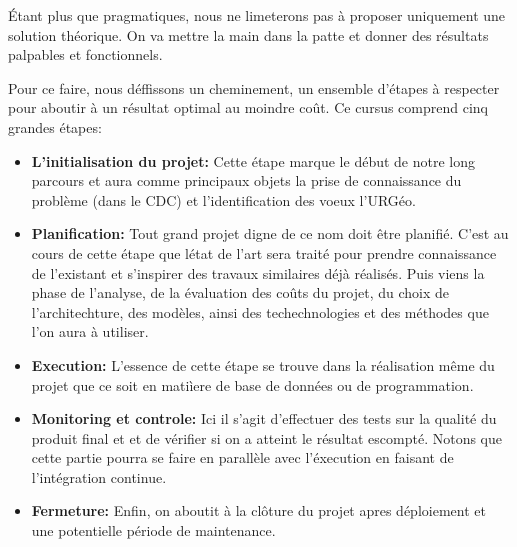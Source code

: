\par
Étant plus que pragmatiques, nous ne limeterons pas à proposer 
uniquement une solution théorique. On va mettre la main dans la patte
et donner des résultats palpables et fonctionnels.
\par
Pour ce faire, nous déffissons un cheminement, un ensemble d'étapes à 
respecter pour aboutir à un résultat optimal au moindre coût.
Ce cursus comprend cinq grandes étapes: 

\begin{itemize}
    \item \textbf{L'initialisation du projet: }
    Cette étape marque le début de notre long parcours et aura comme principaux
    objets la prise de connaissance du problème (dans le CDC) et l'identification des voeux
    l'URGéo.
    \item \textbf{Planification: }
    Tout grand projet digne de ce nom doit être planifié. C'est au cours de cette étape
    que létat de l'art sera traité pour prendre connaissance de l'existant et s'inspirer des travaux
    similaires déjà réalisés. Puis viens la phase de l'analyse, de la évaluation des coûts du projet, 
    du choix  de l'architechture, des modèles,
    ainsi des techechnologies et des méthodes que l'on aura à utiliser.
    \item \textbf{Execution: }
    L'essence de cette étape se trouve dans la réalisation même du projet que ce soit en matiìere de base de 
    données ou de programmation.
    \item \textbf{Monitoring et controle: }
    Ici il s'agit d'effectuer des tests sur la qualité du produit final et et de vérifier si on a atteint le 
    résultat escompté. Notons que cette partie pourra se faire en parallèle avec l'éxecution en faisant de 
    l'intégration continue.
    \item \textbf{Fermeture: }
    Enfin, on aboutit à la clôture du projet apres déploiement et une potentielle période de maintenance.


\end{itemize}  